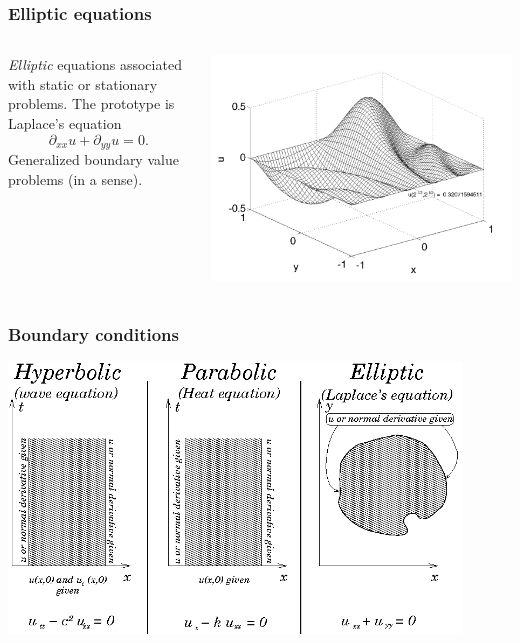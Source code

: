 \documentclass{beamer}
\begin{document}
\begin{frame}
  \frametitle{Elliptic equations}

  \begin{columns}
    \begin{column}{0.45\textwidth}
      \emph{Elliptic} equations associated with static or stationary
      problems. The prototype is Laplace's equation
      \begin{equation*}
        \partial_{x x} u + \partial_{y y} u = 0.
      \end{equation*}
      Generalized boundary value problems (in a sense).
    \end{column}
    \begin{column}{0.55\textwidth}
      \begin{center}
        \includegraphics[width=\textwidth]{figures/SpectralElliptic}
      \end{center}
    \end{column}
  \end{columns}

\end{frame}

\begin{frame}
  \frametitle{Boundary conditions}

  \begin{center}
    \includegraphics[width=0.9\textwidth]{figures/pde_summary}
  \end{center}

\end{frame}
\end{document}
